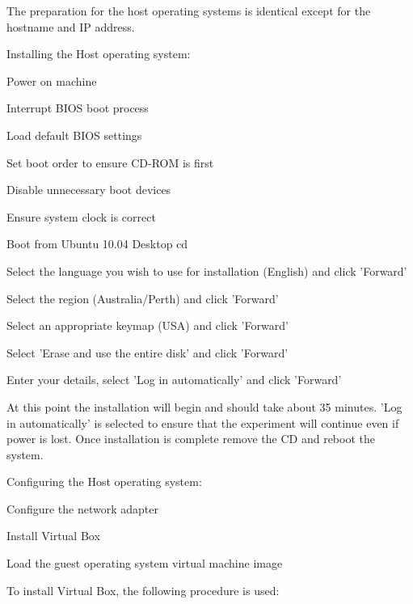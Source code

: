 The preparation for the host operating systems is identical except for the hostname and IP address.

Installing the Host operating system:

\begin{enumerate*}
  \item Power on machine
  \item Interrupt BIOS boot process
  \begin{enumerate*}
    \item Load default BIOS settings
    \item Set boot order to ensure CD-ROM is first
    \item Disable unnecessary boot devices
    \item Ensure system clock is correct
  \end{enumerate*}
  \item Boot from Ubuntu 10.04 Desktop cd
  \item Select the language you wish to use for installation (English) and click 'Forward'
  \item Select the region (Australia/Perth) and click 'Forward'
  \item Select an appropriate keymap (USA) and click 'Forward'
  \item Select 'Erase and use the entire disk' and click 'Forward'
  \item Enter your details, select 'Log in automatically' and click 'Forward'
\end{enumerate*}

At this point the installation will begin and should take about 35 minutes. 'Log in automatically' is selected to ensure that the experiment will continue even if power is lost. Once installation is complete remove the CD and reboot the system.

Configuring the Host operating system:

\begin{enumerate*}
  \item Configure the network adapter
  \item Install Virtual Box
  \item Load the guest operating system virtual machine image
\end{enumerate*}

To install Virtual Box, the following procedure is used:

